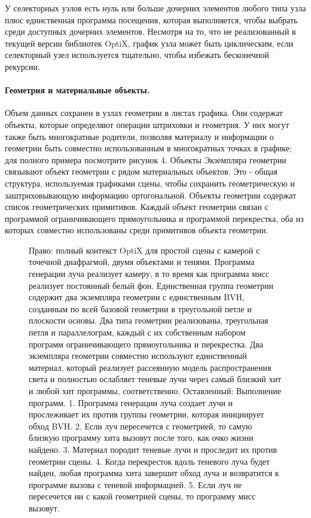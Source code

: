 У селекторных узлов есть нуль или больше дочерних элементов любого типа узла плюс единственная программа посещения, которая выполняется, чтобы выбрать среди доступных дочерних элементов. Несмотря на то, что не реализованный в текущей версии библиотек OptiX, график узла может быть циклическим, если селекторный узел используется тщательно, чтобы избежать бесконечной рекурсии.
\paragraph{ Геометрия и материальные объекты.}

Объем данных сохранен в узлах геометрии в листах графика. Они содержат объекты, которые определяют операции штриховки и геометрия. У них могут также быть многократные родители, позволяя материалу и информации о геометрии быть совместно использованным в многократных точках в графике; для полного примера посмотрите рисунок 4. Объекты Экземпляра геометрии связывают объект геометрии с рядом материальных объектов. Это - общая структура, используемая графиками сцены, чтобы сохранить геометрическую и заштриховывающую информацию ортогональной. Объекты геометрии содержат список геометрических примитивов. Каждый объект геометрии связан с программой ограничивающего прямоугольника и программой перекрестка, оба из которых совместно использованы среди примитивов объекта геометрии.

\begin{figure}[h!]
\caption{Право: полный контекст OptiX для простой сцены с камерой с точечной диафрагмой, двумя объектами и тенями. Программа генерации луча реализует камеру, в то время как программа мисс реализует постоянный белый фон. Единственная группа геометрии содержит два экземпляра геометрии с единственным BVH, созданным по всей базовой геометрии в треугольной петле и плоскости основы. Два типа геометрии реализованы, треугольная петля и параллелограм, каждый с их собственным набором программ ограничивающего прямоугольника и перекрестка. Два экземпляра геометрии совместно используют единственный материал, который реализует рассеянную модель распространения света и полностью ослабляет теневые лучи через самый близкий хит и любой хит
программы, соответственно. Оставленный: Выполнение программ. 1. Программа генерации луча создает лучи и прослеживает их против группы геометрии, которая инициирует обход BVH. 2. Если луч пересечется с геометрией, то самую близкую программу хита вызовут после того, как очко жизни найдено.
3. Материал породит теневые лучи и проследит их против геометрии сцены. 4. Когда перекресток вдоль теневого луча будет найден, любая программа хита завершит обход луча и возвратится к программе вызова с теневой информацией. 5. Если луч не пересечется ни с какой геометрией сцены, то программу мисс вызовут.}
\label{fig1}
\end{figure}

